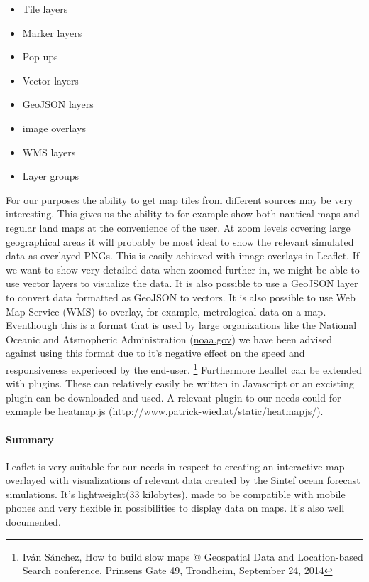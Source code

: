 \documentclass[11pt,a4paper,titlepage,oneside]{report}
\begin{document}
  \begin{itemize}
    \item Tile layers
    \item Marker layers
    \item Pop-ups
    \item Vector layers
    \item GeoJSON layers
    \item image overlays
    \item WMS layers
    \item Layer groups
  \end{itemize}

  For our purposes the ability to get map tiles from different sources may be very interesting. This gives us the ability to for example show both nautical maps and regular land maps at the convenience of the user. At zoom levels covering large geographical areas it will probably be most ideal to show the relevant simulated data as overlayed PNGs. This is easily achieved with image overlays in Leaflet. If we want to show very detailed data when zoomed further in, we might be able to use vector layers to visualize the data. It is also possible to use a GeoJSON layer to convert data formatted as GeoJSON to vectors.
  It is also possible to use Web Map Service (WMS) to overlay, for example, metrological data on a map. Eventhough this is a format that is used by large organizations like the National Oceanic and Atsmopheric Administration (\url{noaa.gov}) we have been advised against using this format due to it's negative effect on the speed and responsiveness experieced by the end-user. \footnote{Iván Sánchez, How to build slow maps @ Geospatial Data and Location-based Search conference. Prinsens Gate 49, Trondheim, September 24, 2014}
  Furthermore Leaflet can be extended with plugins. These can relatively easily be written in Javascript or an excisting plugin can be downloaded and used. A relevant plugin to our needs could for exmaple be heatmap.js (http://www.patrick-wied.at/static/heatmapjs/).

  \paragraph{Summary}
  Leaflet is very suitable for our needs in respect to creating an interactive map overlayed with visualizations of relevant data created by the Sintef ocean forecast simulations. It's lightweight(33 kilobytes), made to be compatible with mobile phones and very flexible in possibilities to display data on maps. It's also well documented.
\end{document}
